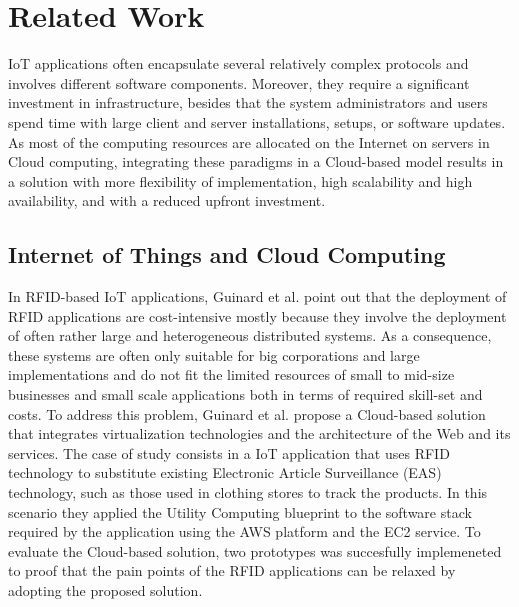 \section{Related Work}
\label{sec:related_work}
IoT applications often encapsulate several relatively complex protocols and involves
different software components. Moreover, they require a significant investment in infrastructure,
besides that the system administrators and users spend time with large client and server
installations, setups, or software updates. As most of the computing resources are allocated
on the Internet on servers in Cloud computing, integrating these paradigms in a Cloud-based model
results in a solution with more flexibility of implementation, high scalability and high availability,
and with a reduced upfront investment.\\
\subsection{Internet of Things and Cloud Computing}
\label{sub:Cloud Computing and Internet of Things}
In RFID-based IoT applications, Guinard et al. \cite{guinard2011cloud} point out that the
deployment of RFID applications are cost-intensive mostly because they involve the
deployment of often rather large and heterogeneous distributed systems. As a consequence,
these systems are often only suitable for big corporations and large implementations and
do not fit the limited resources of small to mid-size businesses and small scale applications
both in terms of required skill-set and costs. To address this problem, Guinard et al. propose
a Cloud-based solution that integrates virtualization technologies and the architecture of
the Web and its services. The case of study consists in a IoT application that uses RFID technology
to substitute existing Electronic Article Surveillance (EAS) technology, such as those used in
clothing stores to track the products. In this scenario they applied the Utility Computing blueprint
to the software stack required by the application using the AWS platform and the EC2 service. To
evaluate the Cloud-based solution, two prototypes was succesfully implemeneted to proof that
the pain points of the RFID applications can be relaxed by adopting the proposed solution.\\


